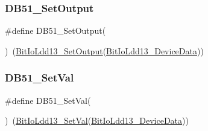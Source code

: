 \mbox{\label{group___d_b51__module_gaf8769995a5d01a13892266b0a8203541}} 
\subsubsection{\texorpdfstring{D\+B51\+\_\+\+Set\+Output}{DB51\_SetOutput}}
{\footnotesize\ttfamily \#define D\+B51\+\_\+\+Set\+Output(\begin{DoxyParamCaption}{ }\end{DoxyParamCaption})~(\hyperlink{group___bit_io_ldd13__module_ga093dde10b8ace24f9342126bad933a77}{Bit\+Io\+Ldd13\+\_\+\+Set\+Output}(\hyperlink{group___bit_io_ldd13__module_gaced3b535c8325a9d8bcaa5fcc7de35d7}{Bit\+Io\+Ldd13\+\_\+\+Device\+Data}))}

\mbox{\label{group___d_b51__module_ga28989533400998062d341d24b4f779e3}} 
\subsubsection{\texorpdfstring{D\+B51\+\_\+\+Set\+Val}{DB51\_SetVal}}
{\footnotesize\ttfamily \#define D\+B51\+\_\+\+Set\+Val(\begin{DoxyParamCaption}{ }\end{DoxyParamCaption})~(\hyperlink{group___bit_io_ldd13__module_ga6525bcbb0341b742d9180be475410ac1}{Bit\+Io\+Ldd13\+\_\+\+Set\+Val}(\hyperlink{group___bit_io_ldd13__module_gaced3b535c8325a9d8bcaa5fcc7de35d7}{Bit\+Io\+Ldd13\+\_\+\+Device\+Data}))}

